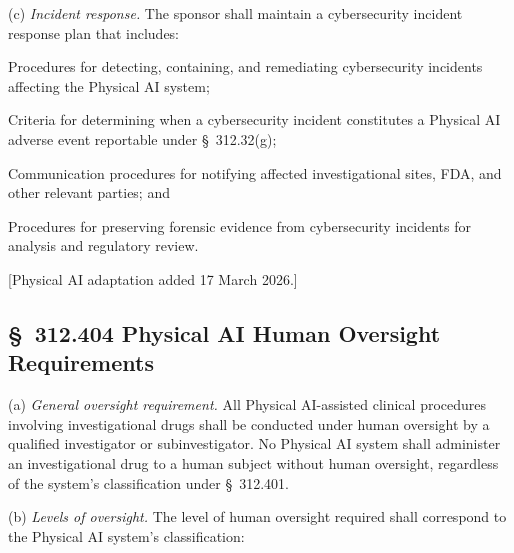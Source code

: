 \documentclass[11pt]{article}
\begin{document}
(c) \textit{Incident response.} The sponsor shall maintain a cybersecurity incident response plan that includes:

\begin{description}[leftmargin=0.8cm,style=sameline]
\item[(1)] Procedures for detecting, containing, and remediating cybersecurity incidents affecting the Physical AI system;
\item[(2)] Criteria for determining when a cybersecurity incident constitutes a Physical AI adverse event reportable under \S~312.32(g);
\item[(3)] Communication procedures for notifying affected investigational sites, FDA, and other relevant parties; and
\item[(4)] Procedures for preserving forensic evidence from cybersecurity incidents for analysis and regulatory review.
\end{description}

[Physical AI adaptation added 17 March 2026.]

\subsection{\S~312.404 Physical AI Human Oversight Requirements}

(a) \textit{General oversight requirement.} All Physical AI-assisted clinical procedures involving investigational drugs shall be conducted under human oversight by a qualified investigator or subinvestigator. No Physical AI system shall administer an investigational drug to a human subject without human oversight, regardless of the system's classification under \S~312.401.

(b) \textit{Levels of oversight.} The level of human oversight required shall correspond to the Physical AI system's classification:
\end{document}
